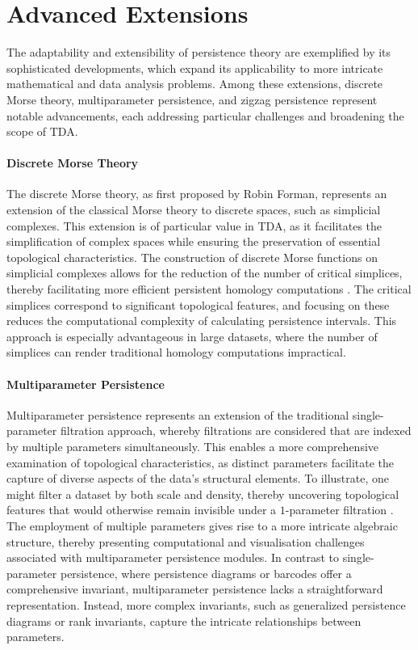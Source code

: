 \section{Advanced Extensions}
The adaptability and extensibility of persistence theory are exemplified by its sophisticated developments, which expand its applicability to more intricate mathematical and data analysis problems. Among these extensions, discrete Morse theory, multiparameter persistence, and zigzag persistence represent notable advancements, each addressing particular challenges and broadening the scope of TDA.

\paragraph*{Discrete Morse Theory}
The discrete Morse theory, as first proposed by Robin Forman, represents an extension of the classical Morse theory to discrete spaces, such as simplicial complexes. This extension is of particular value in TDA, as it facilitates the simplification of complex spaces while ensuring the preservation of essential topological characteristics. The construction of discrete Morse functions on simplicial complexes allows for the reduction of the number of critical simplices, thereby facilitating more efficient persistent homology computations \cite{Forman2002}. The critical simplices correspond to significant topological features, and focusing on these reduces the computational complexity of calculating persistence intervals. This approach is especially advantageous in large datasets, where the number of simplices can render traditional homology computations impractical.

\paragraph*{Multiparameter Persistence}
Multiparameter persistence represents an extension of the traditional single-parameter filtration approach, whereby filtrations are considered that are indexed by multiple parameters simultaneously. This enables a more comprehensive examination of topological characteristics, as distinct parameters facilitate the capture of diverse aspects of the data's structural elements. To illustrate, one might filter a dataset by both scale and density, thereby uncovering topological features that would otherwise remain invisible under a $1$-parameter filtration \cite{CarlssonZomorodian2009}. The employment of multiple parameters gives rise to a more intricate algebraic structure, thereby presenting computational and visualisation challenges associated with multiparameter persistence modules. In contrast to single-parameter persistence, where persistence diagrams or barcodes offer a comprehensive invariant, multiparameter persistence lacks a straightforward representation. Instead, more complex invariants, such as generalized persistence diagrams or rank invariants, capture the intricate relationships between parameters.

